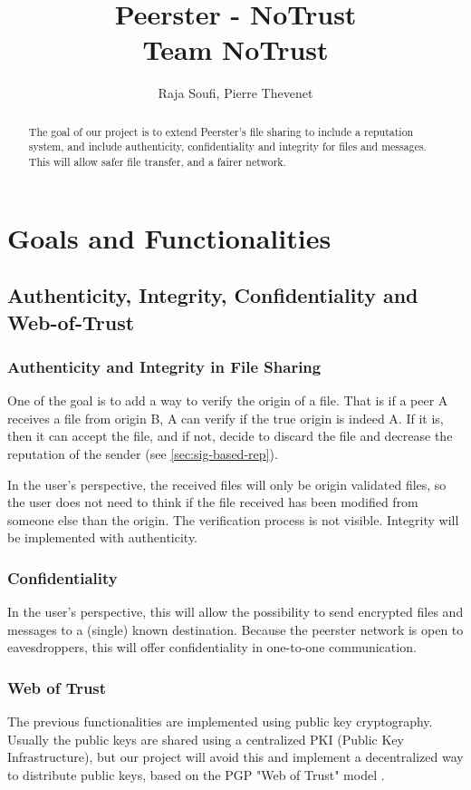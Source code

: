 \documentclass[]{article}
\title{Peerster - NoTrust\\
Team NoTrust}
\author{Raja Soufi, Pierre Thevenet}
\begin{document}
\maketitle

\begin{abstract}
The goal of our project is to extend Peerster's file sharing to include a reputation system, and include authenticity, confidentiality and integrity for files and messages. This will allow safer file transfer, and a fairer network.
\end{abstract}

\section{Goals and Functionalities}

\subsection{Authenticity, Integrity, Confidentiality and Web-of-Trust}

\subsubsection{Authenticity and Integrity in File Sharing}
\label{sec:goals-funcs-auth-integrity}
One of the goal is to add a way to verify the origin of a file. That is if a peer A receives a file from origin B, A can verify if the true origin is indeed A. If it is, then it can accept the file, and if not, decide to discard the file and decrease the reputation of the sender (see \ref{sec:sig-based-rep}). \newline

In the user's perspective, the received files will only be origin validated files, so the user does not need to think if the file received has been modified from someone else than the origin. The verification process is not visible.
Integrity will be implemented with authenticity.

\subsubsection{Confidentiality}
In the user's perspective, this will allow the possibility to send encrypted files and messages to a (single) known destination. Because the peerster network is open to eavesdroppers, this will offer confidentiality in one-to-one communication.

\subsubsection{Web of Trust} 
The previous functionalities are implemented using public key cryptography. Usually the public keys are shared using a centralized PKI (Public Key Infrastructure), but our project will avoid this and implement a decentralized way to distribute public keys, based on the PGP "Web of Trust" model \cite{abdul1997pgp}.
\end{document}
